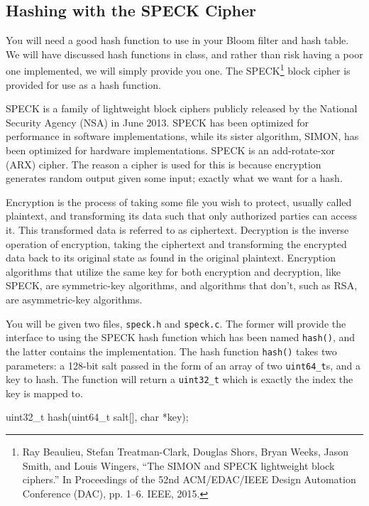 \documentclass{article}
\begin{document}
\subsection{Hashing with the SPECK Cipher}

You will need a good hash function to use in your Bloom filter and hash
table. We will have discussed hash functions in class, and rather than
risk having a poor one implemented, we will simply provide you one. The
SPECK\footnote{ Ray Beaulieu, Stefan Treatman-Clark, Douglas Shors,
  Bryan Weeks, Jason Smith, and Louis Wingers, ``The {SIMON} and {SPECK}
lightweight block ciphers.'' In Proceedings of the 52nd ACM/EDAC/IEEE
Design Automation Conference (DAC), pp.  1--6. IEEE, 2015.} block cipher
is provided for use as a hash function.

SPECK is a family of lightweight block ciphers publicly released by the
National Security Agency (NSA) in June 2013.  SPECK has been optimized
for performance in software implementations, while its sister algorithm,
SIMON, has been optimized for hardware implementations. SPECK is an
add-rotate-xor (ARX) cipher. The reason a cipher is used for this is
because encryption generates random output given some input; exactly
what we want for a hash.

Encryption is the process of taking some file you wish to protect,
usually called plaintext, and transforming its data such that only
authorized parties can access it. This transformed data is referred to
as ciphertext. Decryption is the inverse operation of encryption, taking
the ciphertext and transforming the encrypted data back to its original
state as found in the original plaintext. Encryption algorithms that
utilize the same key for both encryption and decryption, like SPECK, are
symmetric-key algorithms, and algorithms that don't, such as RSA, are
asymmetric-key algorithms.

You will be given two files, \texttt{speck.h} and \texttt{speck.c}. The
former will provide the interface to using the SPECK hash function which
has been named \texttt{hash()}, and the latter contains the
implementation. The hash function \texttt{hash()} takes two parameters:
a 128-bit salt passed in the form of an array of two
\texttt{uint64\_t}s, and a key to hash. The function will return a
\texttt{uint32\_t} which is exactly the index the key is mapped to.

\begin{codelisting}{}
uint32_t hash(uint64_t salt[], char *key);
\end{codelisting}{}
\end{document}
